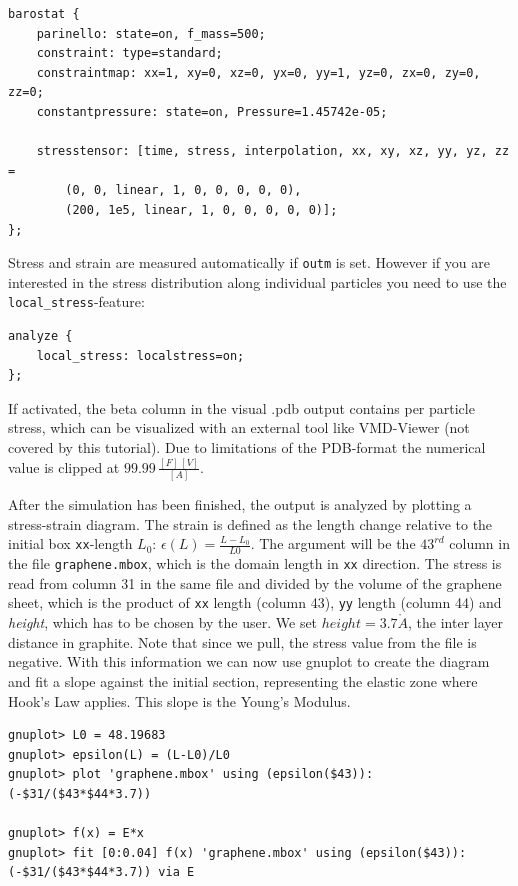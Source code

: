 \begin{lstlisting}
barostat {
    parinello: state=on, f_mass=500;
    constraint: type=standard;
    constraintmap: xx=1, xy=0, xz=0, yx=0, yy=1, yz=0, zx=0, zy=0, zz=0;
    constantpressure: state=on, Pressure=1.45742e-05;

    stresstensor: [time, stress, interpolation, xx, xy, xz, yy, yz, zz =
        (0, 0, linear, 1, 0, 0, 0, 0, 0),
        (200, 1e5, linear, 1, 0, 0, 0, 0, 0)];
};
\end{lstlisting}

Stress and strain are measured automatically if \texttt{outm} is set. However
if you are interested in the stress distribution along individual particles you
need to use the \texttt{local\_stress}-feature:

\begin{lstlisting}
analyze {
    local_stress: localstress=on;
};
\end{lstlisting}

If activated, the beta column in the visual .pdb output contains per particle
stress, which can be visualized with an external tool like VMD-Viewer (not
covered by this tutorial). Due to limitations of the PDB-format the numerical
value is clipped at $99.99\,\frac{[F]\,[V]}{[A]}$.

After the simulation has been finished, the output is analyzed by plotting a
stress-strain diagram. The strain is defined as the length change relative to
the initial box \texttt{xx}-length $L_0$: $\epsilon(L) = \frac{L-L_0}{L0}$.
The argument will be the $43^{rd}$ column in the file \texttt{graphene.mbox}, which
is the domain length in \texttt{xx} direction. The stress is read
from column 31 in the same file and divided by the volume of the graphene sheet, which is the product of
\texttt{xx} length (column 43), \texttt{yy} length (column 44) and
\textit{height}, which has to be chosen by the user. We set $height=3.7
\mathring{A}$, the inter layer distance in graphite. Note that since we pull,
the stress value from the file is negative. With this information we can now
use gnuplot to create the diagram and fit a slope against the initial
section, representing the elastic zone where Hook's Law applies. This slope is
the Young's Modulus.

\begin{lstlisting}
gnuplot> L0 = 48.19683
gnuplot> epsilon(L) = (L-L0)/L0
gnuplot> plot 'graphene.mbox' using (epsilon($43)):(-$31/($43*$44*3.7))

gnuplot> f(x) = E*x
gnuplot> fit [0:0.04] f(x) 'graphene.mbox' using (epsilon($43)):(-$31/($43*$44*3.7)) via E
\end{lstlisting}

